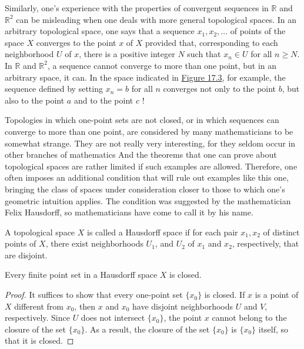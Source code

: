 Similarly, one's experience with the properties of convergent sequences in \(\mathbb{R}\) and \(\mathbb{R}^{2}\) can be misleading when one deals with more general topological spaces. In an arbitrary topological space, one says that a sequence \(x_{1},x_{2},\ldots\) of points of the space \(X\) converges to the point \(x\) of \(X\) provided that, corresponding to each neighborhood \(U\) of \(x\), there is a positive integer \(N\) such that \(x_{n} \in U\) for all \(n \geq N\). In \(\mathbb{R}\) and \(\mathbb{R}^{2}\), a sequence cannot converge to more than one point, but in an arbitrary space, it can. In the space indicated in \hyperref[fig:17.3]{Figure 17.3}, for example, the sequence defined by setting \(x_{n} = b\) for all \(n\) converges not only to the point \(b\), but also to the point \(a\) and to the point \(c\) !

Topologies in which one-point sets are not closed, or in which sequences can converge to more than one point, are considered by many mathematicians to be somewhat strange. They are not really very interesting, for they seldom occur in other branches of mathematics And the theorems that one can prove about topological spaces are rather limited if such examples are allowed. Therefore, one often imposes an additional condition that will rule out examples like this one, bringing the class of spaces under consideration closer to those to which one's geometric intuition applies. The condition was suggested by the mathematician Felix Hausdorff, so mathematicians have come to call it by his name.

\begin{definition}
 A topological space \(X\) is called a Hausdorff space if for each pair \(x_{1},x_{2}\) of distinct points of \(X\), there exist neighborhoods \(U_{1}\), and \(U_{2}\) of \(x_{1}\) and \(x_{2}\), respectively, that are disjoint.
\end{definition}

\begin{theorem}
\label{thm:\thetheorem}
 Every finite point set in a Hausdorff space \(X\) is closed.
\end{theorem}

\begin{proof}
 It suffices to show that every one-point set \(\{ x_{0}\}\) is closed. If \(x\) is a point of \(X\) different from \(x_{0}\), then \(x\) and \(x_{0}\) have disjoint neighborhoods \(U\) and \(V\), respectively. Since \(U\) does not intersect \(\{ x_{0}\}\), the point \(x\) cannot belong to the closure of the set \(\{ x_{0}\}\). As a result, the closure of the set \(\{ x_{0}\}\) is \(\{ x_{0}\}\) itself, so that it is closed.
\end{proof}

